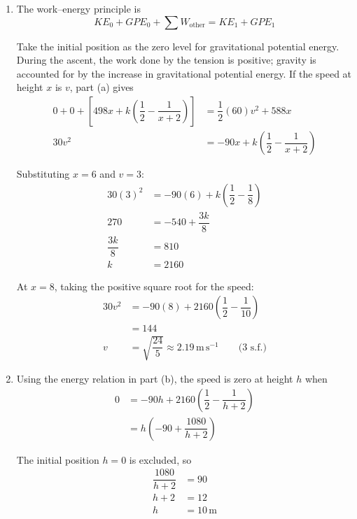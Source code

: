 \documentclass[leqno]{article}
\begin{document}
\begin{enumerate}[
  label=\textbf{\arabic*.},
  leftmargin=*,
  topsep=0pt,
  partopsep=0pt,
  parsep=0pt
]
\begin{djsSolution}
\begin{enumerate}[label=\textbf{(\alph*)}, start=1]
The weight is \(60(9.8)=588\,\mathrm{N}\). At the required height, \(x\geq 0\), so \(x+2>0\). Equating the tension to the weight gives
\begin{align*}
498+\dfrac{k}{(x+2)^2}&=588\\
\dfrac{k}{(x+2)^2}&=90\\
(x+2)^2&=\dfrac{k}{90}\\
x&=\left(\sqrt{\dfrac{k}{90}}-2\right)\,\mathrm{m}
\end{align*}

\item The work--energy principle is
\[
KE_0+GPE_0+\sum W_{\text{other}}
=KE_1+GPE_1
\]

Take the initial position as the zero level for gravitational potential energy. During the ascent, the work done by the tension is positive; gravity is accounted for by the increase in gravitational potential energy. If the speed at height \(x\) is \(v\), part (a) gives
\begin{align*}
0+0+\left[498x+k\left(\dfrac12-\dfrac{1}{x+2}\right)\right]
&=\dfrac12(60)v^2+588x\\
30v^2&=-90x+k\left(\dfrac12-\dfrac{1}{x+2}\right)
\end{align*}

Substituting \(x=6\) and \(v=3\):
\begin{align*}
30(3)^2&=-90(6)+k\left(\dfrac12-\dfrac18\right)\\
270&=-540+\dfrac{3k}{8}\\
\dfrac{3k}{8}&=810\\
k&=2160
\end{align*}

At \(x=8\), taking the positive square root for the speed:
\begin{align*}
30v^2&=-90(8)+2160\left(\dfrac12-\dfrac{1}{10}\right)\\
&=144\\
v&=\sqrt{\dfrac{24}{5}}\approx 2.19\,\mathrm{m\,s^{-1}}\qquad\text{(3 s.f.)}
\end{align*}

\item Using the energy relation in part (b), the speed is zero at height \(h\) when
\begin{align*}
0&=-90h+2160\left(\dfrac12-\dfrac{1}{h+2}\right)\\
&=h\left(-90+\dfrac{1080}{h+2}\right)
\end{align*}

The initial position \(h=0\) is excluded, so
\begin{align*}
\dfrac{1080}{h+2}&=90\\
h+2&=12\\
h&=10\,\mathrm{m}
\end{align*}


\end{enumerate}
\end{djsSolution}
\end{enumerate}
\end{document}
